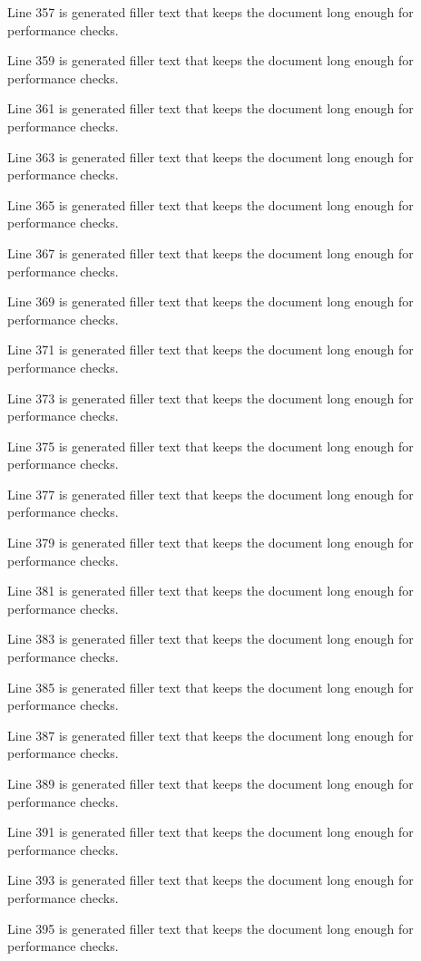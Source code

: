 Line 357 is generated filler text that keeps the document long enough for performance checks.

Line 359 is generated filler text that keeps the document long enough for performance checks.

Line 361 is generated filler text that keeps the document long enough for performance checks.

Line 363 is generated filler text that keeps the document long enough for performance checks.

Line 365 is generated filler text that keeps the document long enough for performance checks.

Line 367 is generated filler text that keeps the document long enough for performance checks.

Line 369 is generated filler text that keeps the document long enough for performance checks.

Line 371 is generated filler text that keeps the document long enough for performance checks.

Line 373 is generated filler text that keeps the document long enough for performance checks.

Line 375 is generated filler text that keeps the document long enough for performance checks.

Line 377 is generated filler text that keeps the document long enough for performance checks.

Line 379 is generated filler text that keeps the document long enough for performance checks.

Line 381 is generated filler text that keeps the document long enough for performance checks.

Line 383 is generated filler text that keeps the document long enough for performance checks.

Line 385 is generated filler text that keeps the document long enough for performance checks.

Line 387 is generated filler text that keeps the document long enough for performance checks.

Line 389 is generated filler text that keeps the document long enough for performance checks.

Line 391 is generated filler text that keeps the document long enough for performance checks.

Line 393 is generated filler text that keeps the document long enough for performance checks.

Line 395 is generated filler text that keeps the document long enough for performance checks.

